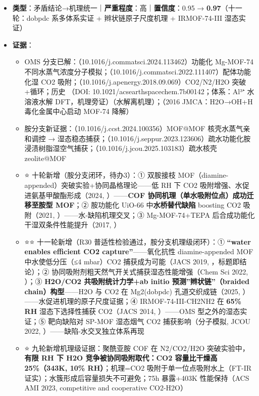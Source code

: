 \documentclass[12pt,a4paper]{ctexart}
\providecommand{\tightlist}{%
  \setlength{\itemsep}{0pt}\setlength{\parskip}{0pt}}
\begin{document}
\begin{itemize}
\tightlist
\item
  \textbf{类型}：矛盾结论→机理统一｜\textbf{严重程度}：高｜\textbf{置信度}：0.95 → \textbf{0.97}（十一轮：dobpdc 系多体系实证 + 辫状链原子尺度机理 + IRMOF-74-III 湿态实证）
\item
  \textbf{证据}：

  \begin{itemize}
  \tightlist
  \item
    OMS 分支已解：\cite{p186}（10.1016/j.commatsci.2024.113462）功能化 Mg-MOF-74 不同水蒸气浓度分子模拟；\cite{p182}（10.1016/j.commatsci.2022.111407）配体功能化湿 CO2 吸附；\cite{p196}（10.1016/j.apenergy.2018.09.069）CO2/N2/H2O 突破+循环；历史 \cite{p168}（DOI: 10.1021/acsearthspacechem.7b00142；体系：Al³⁺ 水溶液水解 DFT，机理旁证）（水解离机理）；\cite{r11s4_b2c67eefd8bc}（2016 JMCA：H2O→OH+H 毒化金属中心启动 MOF-74 降解）
  \item
    胺分支新证据：\cite{p116}（10.1016/j.ccst.2024.100356）MOF@MOF 核壳水蒸气亲和调控 → 湿态稳态捕获；\cite{p224}（10.1016/j.seppur.2023.123606）疏水功能化胺浸渍树脂湿空气捕获；\cite{p201}（10.1016/j.jcou.2025.103183）疏水核壳 zeolite@MOF
  \item
    ⭐ 十轮新增（胺分支闭环，待办3）：① 双胺接枝 MOF（diamine-appended）突破实验+协同晶格理论------低 RH 下 CO2 吸附增强、水促进氨基甲酸酯形成（2024, \cite{r10s0_7e6841cd666f}）------\textbf{COF 协同机理（单水吸附位点）成功迁移至胺型 MOF}；② 胺功能化 UiO-66 中\textbf{水桥替代缺陷} boosting CO2 吸附（2021, \cite{r10s0_1fbbe940f717}）------水-缺陷机理交叉；③ Mg-MOF-74+TEPA 后合成功能化干湿双条件性能提升（2017, \cite{r10s0_4eac43c57449}）
  \item
    ⭐⭐ 十一轮新增（R30 普适性检验通过，胺分支机理级闭环）：① \textbf{``water enables efficient CO2 capture''}------氧化抗性 diamine-appended MOF 中水使低分压（≤4 mbar）CO2 捕获成为可能（JACS 2019, \cite{r11s0_5514c3aa655e}，标题即结论）；② 协同吸附剂粗天然气开关式捕获湿态性能增强（Chem Sci 2022, \cite{r11s0_d9371eaa1c08}）；③ \textbf{H2O/CO2 共吸附统计力学+ab initio 预测''辫状链''（braided chain）构型}------H2O 与 CO2 在 Mg2(dobpdc) 孔道交织成链（2025, \cite{r11s2_1fdf67d949bc}）------水促进机理的原子尺度证据；④ IRMOF-74-III-CH2NH2 在 \textbf{65\% RH} 湿态下选择性捕获 CO2（JACS 2014, \cite{r11s4_2c91341a5f47}）------OMS 型之外的湿态实证；⑤ 靶向缺陷对 SP-MOF 湿态烟气 CO2 捕获影响（分子模拟, JCOU 2022, \cite{r11s3_8dfa6887a211}）------缺陷-水交叉独立体系再现
  \item
    ⭐ 九轮新增机理级证据：聚酰亚胺 COF 在 N2/CO2/H2O 突破实验中，\textbf{有限 RH 下 H2O 竞争被协同吸附取代：CO2 容量比干燥高 25\%（343K, 10\% RH）}；机理=CO2 吸附于单一位点吸附水上（FT-IR 证实）；水簇形成后容量损失不可避免；75h 暴露+403K 性能保持（ACS AMI 2023, competitive and cooperative CO2-H2O）

\end{itemize}
\end{itemize}
\end{document}
